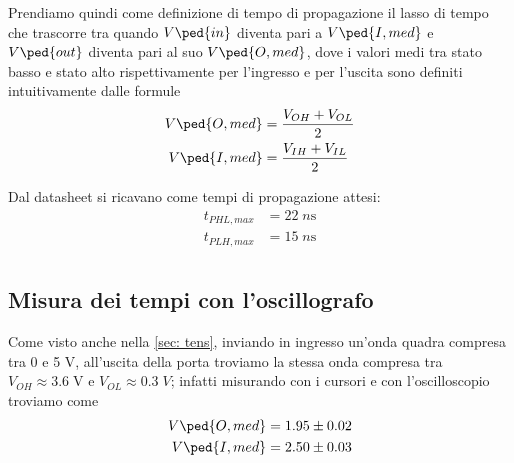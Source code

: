 \documentclass[10pt, a4paper, italian]{article}
\begin{document}
Prendiamo quindi come definizione di tempo di propagazione il lasso di tempo
che trascorre tra quando $V\ped{in}$ diventa pari a $V\ped{I, med}$ e
$V\ped{out}$ diventa pari al suo $V\ped{O, med}$, dove i valori medi tra stato
basso e stato alto rispettivamente per l'ingresso e per l'uscita sono
definiti intuitivamente dalle formule
\begin{align*}
V\ped{O, med} &= \frac{V_{OH} + V_{OL}}{2} \\
V\ped{I, med} &= \frac{V_{IH} + V_{IL}}{2} \\
\end{align*}

Dal datasheet si ricavano come tempi di propagazione attesi:
\begin{align*}
    t_{PHL,max} &= 22 \; \si{n\s} \\
    t_{PLH,max} &= 15 \; \si{n\s} \\
\end{align*}

\subsection{Misura dei tempi con l'oscillografo}
Come visto anche nella \cref{sec: tens}, inviando in ingresso un'onda quadra
compresa tra 0 e 5 V, all'uscita della porta troviamo la stessa onda compresa
tra $V_{OH} \approx 3.6 \; \si{\V}$ e $V_{OL} \approx 0.3  \; \si{V}$;
infatti misurando con i cursori e con l'oscilloscopio troviamo come
\begin{align*}
V\ped{O, med} = 1.95 \pm 0.02 \\
V\ped{I, med} = 2.50 \pm 0.03 \\
\end{align*}
\end{document}
